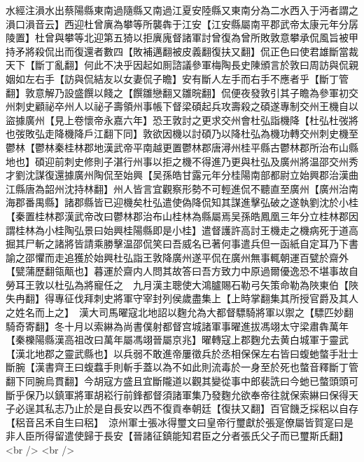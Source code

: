 水經注溳水出蔡陽縣東南過隨縣又南過江夏安陸縣又東南分為二水西入于沔者謂之溳口溳音云】西迎杜曾廙為攀等所襲犇于江安【江安縣屬南平郡武帝太康元年分孱陵置】杜曾與攀等北迎第五猗以拒廙廆督諸軍討曾復為曾所敗敦意攀承侃風旨被甲持矛將殺侃出而復還者數四【敗補邁翻被皮義翻復扶又翻】侃正色曰使君雄斷當裁天下【斷丁亂翻】何此不决乎因起如厠諮議參軍梅陶長史陳頒言於敦曰周訪與侃親姻如左右手【訪與侃結友以女妻侃子瞻】安有斷人左手而右手不應者乎【斷丁管翻】敦意解乃設盛饌以餞之【饌雛戀翻又雛晥翻】侃便夜發敦引其子瞻為參軍初交州刺史顧祕卒州人以祕子壽領州事帳下督梁碩起兵攻壽殺之碩遂專制交州王機自以盜據廣州【見上卷懷帝永嘉六年】恐王敦討之更求交州會杜弘詣機降【杜弘杜弢將也弢敗弘走降機降戶江翻下同】敦欲因機以討碩乃以降杜弘為機功轉交州刺史機至鬱林【鬱林秦桂林郡地漢武帝平南越更置鬱林郡唐潯州桂平縣古鬱林郡所治布山縣地也】碩迎前刺史修則子湛行州事以拒之機不得進乃更與杜弘及廣州將温邵交州秀才劉沈謀復還據廣州陶侃至始興【吴孫皓甘露元年分桂陽南部都尉立始興郡治漢曲江縣唐為韶州沈持林翻】州人皆言宜觀察形勢不可輕進侃不聽直至廣州【廣州治南海郡番禺縣】諸郡縣皆已迎機矣杜弘遣使偽降侃知其謀進擊弘破之遂執劉沈於小桂【秦置桂林郡漢武帝改曰鬱林郡治布山桂林為縣屬焉吴孫皓鳳凰三年分立桂林郡因謂桂林為小桂陶弘景曰始興桂陽縣即是小桂】遣督護許高討王機走之機病死于道高掘其尸斬之諸將皆請乘勝擊温邵侃笑曰吾威名已著何事遣兵但一函紙自定耳乃下書諭之邵懼而走追獲於始興杜弘詣王敦降廣州遂平侃在廣州無事輒朝運百甓於齋外【甓蒲歷翻瓴甋也】暮運於齋内人問其故答曰吾方致力中原過爾優逸恐不堪事故自勞耳王敦以杜弘為將寵任之　九月漢主聰使大鴻臚賜石勒弓矢策命勒為陜東伯【陜失冉翻】得專征伐拜刺史將軍守宰封列侯歲盡集上【上時掌翻集其所授官爵及其人之姓名而上之】　漢大司馬曜寇北地詔以麴允為大都督驃騎將軍以禦之【驃匹妙翻騎奇寄翻】冬十月以索綝為尚書僕射都督宫城諸軍事曜進拔馮翊太守梁肅犇萬年【秦櫟陽縣漢高祖改曰萬年屬馮翊晉屬京兆】曜轉寇上郡麴允去黄白城軍于靈武【漢北地郡之靈武縣也】以兵弱不敢進帝屢徵兵於丞相保保左右皆曰蝮虵螫手壯士斷腕【漢書齊王曰蝮蠚手則斬手蓋以為不如此則流毒於一身至於死也螫音釋斷丁管翻下同腕烏貫翻】今胡寇方盛且宜斷隴道以觀其變從事中郎裴詵曰今虵已螫頭頭可斷乎保乃以鎮軍將軍胡崧行前鋒都督須諸軍集乃發麴允欲奉帝往就保索綝曰保得天子必逞其私志乃止於是自長安以西不復貢奉朝廷【復扶又翻】百官饑乏採稆以自存【稆音呂禾自生曰稆】　涼州軍士張冰得璽文曰皇帝行璽獻於張寔僚屬皆賀寔曰是非人臣所得留遣使歸于長安【晉諸征鎮能知君臣之分者張氏父子而已璽斯氏翻】<br />
<br />
